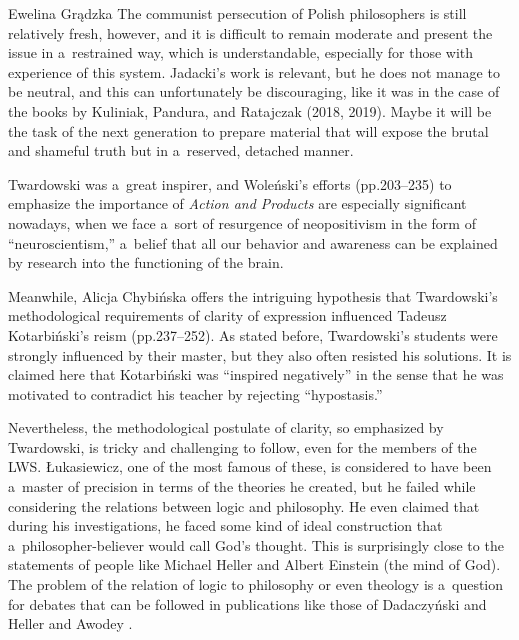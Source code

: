 \begin{newrevengenv}{Ewelina Grądzka}
The communist persecution of Polish philosophers is still relatively fresh, however, and it is difficult to remain moderate and present the issue in a~restrained way, which is understandable, especially for those with experience of this system. Jadacki's work is relevant, but he does not manage to be neutral, and this can unfortunately be discouraging, like it was in the case of the books by Kuliniak, Pandura, and Ratajczak (2018, 2019). Maybe it will be the task of the next generation to prepare material that will expose the brutal and shameful truth but in a~reserved, detached manner.

Twardowski was a~great inspirer, and Woleński's efforts (pp.203–235) to emphasize the importance of \textit{Action and Products}
\parencite[cf.][]{brandl_actions_1999}
are especially significant nowadays, when we face a~sort of resurgence of neopositivism in the form of ``neuroscientism,'' a~belief that all our behavior and awareness can be explained by research into the functioning of the brain.

Meanwhile, Alicja Chybińska offers the intriguing hypothesis that Twardowski's methodological requirements of clarity of expression influenced Tadeusz Kotarbiński's reism (pp.237–252). As stated before, Twardowski's students were strongly influenced by their master, but they also often resisted his solutions. It is claimed here that Kotarbiński was ``inspired negatively'' in the sense that he was motivated to contradict his teacher by rejecting ``hypostasis.''

Nevertheless, the methodological postulate of clarity, so emphasized by Twardowski, is tricky and challenging to follow, even for the members of the LWS. Łukasiewicz, one of the most famous of these, is considered to have been a~master of precision in terms of the theories he created, but he failed while considering the relations between logic and philosophy. He even claimed that during his investigations, he faced some kind of ideal construction that a~philosopher-believer would call God's thought. This is surprisingly close to the statements of people like Michael Heller
\parencite*{heller_god_2019}
and Albert Einstein (the mind of God). The problem of the relation of logic to philosophy or even theology is a~question for debates that can be followed in publications like those of Dadaczyński
\parencite*{dadaczynski_remarks_2014}
and Heller and Awodey
\parencite*{awodey_homunculus_2020}.


\end{newrevengenv}
